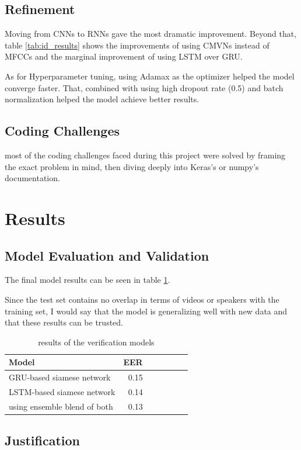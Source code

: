 \documentclass{article}
\begin{document}
\subsection{Refinement}
Moving from CNNs to RNNs gave the most dramatic improvement. Beyond that, table \ref{tab:id_results} shows the improvements of using CMVNs instead of MFCCs and the marginal improvement of using LSTM over GRU.

As for Hyperparameter tuning, using Adamax as the optimizer helped the model converge faster. That, combined with using high dropout rate (0.5) and batch normalization helped the model achieve better results.

\subsection{Coding Challenges}
most of the coding challenges faced during this project were solved by framing the exact problem in mind, then diving deeply into Keras's\cite{chollet2015keras} or numpy's documentation.
\section{Results}
\subsection{Model Evaluation and Validation}
The final model results can be seen in table \ref{tab:ver_results}.

Since the test set contains no overlap in terms of videos or speakers with the training set, I would say that the model is generalizing well with new data and that these results can be trusted.
\begin{table}[H]
    \centering
    \begin{tabular}{l*{6}r}
        Model & EER\\
        \hline
        GRU-based siamese network & 0.15  \\
        LSTM-based siamese network & 0.14  \\
        using ensemble blend of both & 0.13  \\
    \end{tabular}
    \caption{results of the verification models}
    \label{tab:ver_results}
\end{table}

\subsection{Justification}
\end{document}
